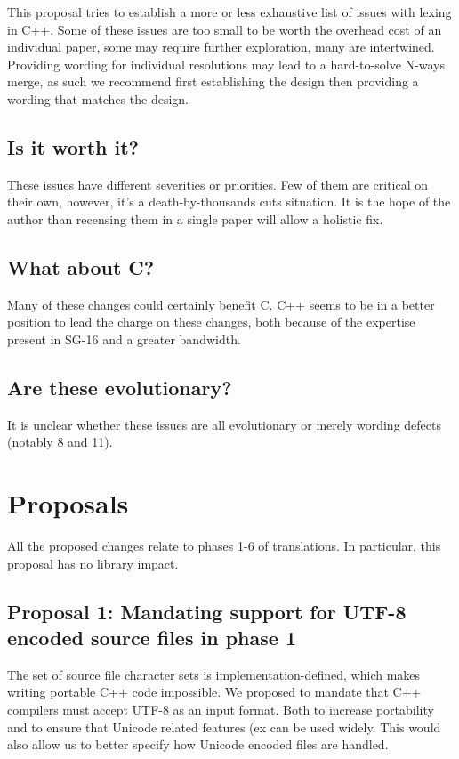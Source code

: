 \documentclass{wg21}
\begin{document}
This proposal tries to establish a more or less exhaustive list of issues with lexing in C++.
Some of these issues are too small to be worth the overhead cost of an individual paper, some may require further exploration,
many are intertwined.
Providing wording for individual resolutions may lead to a hard-to-solve N-ways merge, as such we recommend first establishing the design
then providing a wording that matches the design.

\subsection{Is it worth it?}

These issues have different severities or priorities. Few of them are critical on their own, however, it's a death-by-thousands cuts situation.
It is the hope of the author than recensing them in a single paper will allow a holistic fix.

\subsection{What about C?}

Many of these changes could certainly benefit C. C++ seems to be in a better position to lead the charge on these changes, both because of the expertise present in SG-16 and a greater bandwidth.

\subsection{Are these evolutionary?}

It is unclear whether these issues are all evolutionary or merely wording defects (notably 8 and 11).

\section{Proposals}

All the proposed changes relate to phases 1-6 of translations.
In particular, this proposal has no library impact.

\subsection{Proposal 1: Mandating support for UTF-8 encoded source files in phase 1}

The set of source file character sets is implementation-defined, which makes writing portable C++ code impossible.
We proposed to mandate that C++ compilers must accept UTF-8 as an input format. Both to increase portability and
to ensure that Unicode related features (ex  can be used widely.
This would also allow us to better specify how Unicode encoded files are handled.
\end{document}
